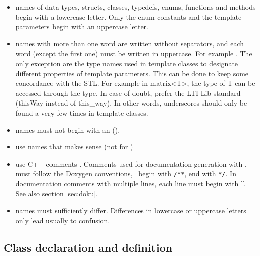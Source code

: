 \begin{itemize}
\item names of data types, structs, classes, typedefs, enums, functions and
  methods begin with a lowercase letter.  Only the enum constants and the
  template parameters begin with an uppercase letter.
     
\item names with more than one word are written without separators, and each
  word (except the first one) must be written in uppercase.  For example
  .  The only exception are the
  type names used in template classes to designate different properties of
  template parameters.  This can be done to keep some concordance with
  the STL.  For example in matrix<T>, the type of T can be accessed through
  the  type.  In case of doubt, prefer the LTI-Lib standard 
  (thisWay instead of this\_way).  In other words, underscores should only
  be found a very few times in template classes.
\item names must not begin with an  (\code{\_}).
\item use names that makes sense (not  for )
\item use C++ comments \code{//}.  Comments used for documentation
  generation with , must follow the Doxygen conventions, \ie\
  begin with \verb+/**+, end with \verb+*/+.  In documentation comments with
  multiple lines, each line must begin with '\code{*}'.  See also section
  \ref{sec:doku}.
\item names must sufficiently differ.  Differences in lowercase or
  uppercase letters only lead usually to confusion.
\end{itemize}

\subsection{Class declaration and definition}

